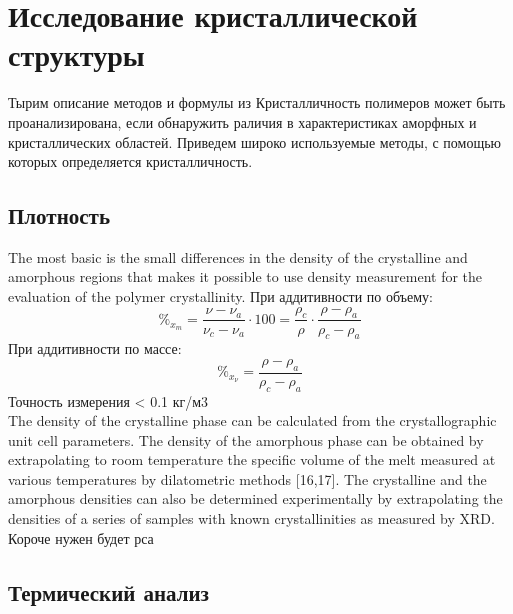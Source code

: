 \section{Исследование кристаллической структуры}

Тырим описание методов и формулы из \cite{cryst3}
Кристалличность полимеров может быть проанализирована, если обнаружить раличия в характеристиках аморфных и кристаллических областей. Приведем широко используемые методы, с помощью которых определяется кристалличность.

\subsection{Плотность}
The most basic is the
small differences in the density of the crystalline and amorphous regions that makes it
possible to use density measurement for the evaluation of the polymer crystallinity.
При аддитивности по объему:
\[
\%_{x_m} =\frac{\nu - \nu_a}{\nu_c - \nu_a}\cdot100 = \frac{\rho_c}{\rho}\cdot\frac{\rho - \rho_a}{\rho_c-\rho_a}
\]
При аддитивности по массе:
\[
\%_{x_{\nu}} =\frac{\rho - \rho_a}{\rho_c-\rho_a}
\]
Точность измерения < 0.1 кг/м3\\
The density of the crystalline phase
can be calculated from the crystallographic unit cell parameters. The density of
the amorphous phase can be obtained by extrapolating to room temperature the specific
volume of the melt measured at various temperatures by dilatometric methods
[16,17]. The crystalline and the amorphous densities can also be determined experimentally
by extrapolating the densities of a series of samples with known crystallinities
as measured by XRD.\\
Короче нужен будет рса

\subsection{Термический анализ}


